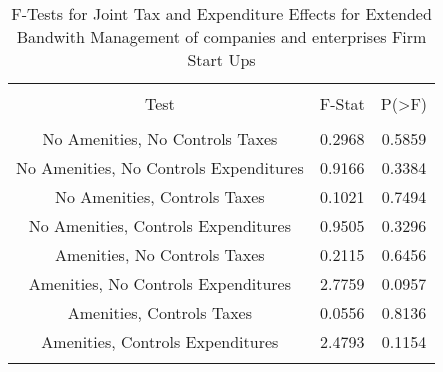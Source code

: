 
\begin{table}[!htbp] \centering 
  \caption{F-Tests for Joint Tax and Expenditure Effects for Extended Bandwith Management of companies and enterprises Firm Start Ups} 
  \label{55Ftests} 
\begin{tabular}{@{\extracolsep{5pt}} ccc} 
\\[-1.8ex]\hline 
\hline \\[-1.8ex] 
Test & F-Stat & P(\textgreater F) \\ 
\hline \\[-1.8ex] 
No Amenities, No Controls Taxes & 0.2968 & 0.5859 \\ 
No Amenities, No Controls Expenditures & 0.9166 & 0.3384 \\ 
No Amenities, Controls Taxes & 0.1021 & 0.7494 \\ 
No Amenities, Controls Expenditures & 0.9505 & 0.3296 \\ 
Amenities, No Controls Taxes & 0.2115 & 0.6456 \\ 
Amenities, No Controls Expenditures & 2.7759 & 0.0957 \\ 
Amenities, Controls Taxes & 0.0556 & 0.8136 \\ 
Amenities, Controls Expenditures & 2.4793 & 0.1154 \\ 
\hline \\[-1.8ex] 
\end{tabular} 
\end{table} 
